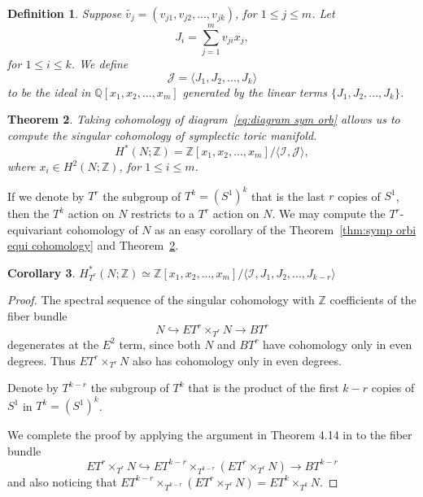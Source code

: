 \documentclass[12pt]{amsart}
\def\Q {{\mathbb{Q}}}
\def\Z {{\mathbb{Z}}}
\def\I {{\mathcal{I}}}
\def\J {{\mathcal{J}}}
\newtheorem{theorem}{Theorem}[section]
\newtheorem{corollary}[theorem]{Corollary}
\newtheorem{definition}[theorem]{Definition}
\theoremstyle{definition}
\numberwithin{equation}{section}
\begin{document}
\begin{definition}
Suppose $\tilde{v_{j}}=(v_{j1},v_{j2},...,v_{jk})$, for $1\leq j\leq
m$. Let
\begin{equation}J_{i}=\sum_{j=1}^{m}v_{ji}x_{j},
\end{equation}
for $1\leq i\leq k$. We define
\begin{equation}
\J=\langle J_{1},J_{2},...,J_{k}\rangle
\end{equation}
to be the ideal in $\Q[x_{1},x_{2},...,x_{m}]$ generated by the
linear terms $\{J_{1},J_{2},...,J_{k}\}$.
\end{definition}

\begin{theorem}\cite{DJ}\label{thm:symp orbi cohomology}
Taking cohomology of diagram~\eqref{eq:diagram sym orb} allows us to
compute the singular cohomology of symplectic toric manifold.
\begin{equation}
H^{*}(N;\Z)=\Z[x_{1},x_{2},...,x_{m}]/\langle \I,\J\rangle ,
\end{equation}
where $x_{i}\in H^{2}(N;\Z)$, for $1\leq i\leq m$.
\end{theorem}

If we denote by $T^r$ the subgroup of $T^k=(S^1)^k$ that is the last
$r$ copies of $S^1$, then the $T^k$ action on $N$ restricts to a
$T^r$ action on $N$. We may compute the $T^r$-equivariant cohomology
of $N$ as an easy corollary of the Theorem~\ref{thm:symp orbi equi
cohomology} and Theorem~\ref{thm:symp orbi cohomology}.

\begin{corollary}
$H_{T^r}^{*}(N;\Z)\simeq \Z[x_{1},x_{2},...,x_{m}]/\langle\I,
J_{1},J_{2},...,J_{k-r}\rangle$
\end{corollary}
\begin{proof}
The spectral sequence of the singular cohomology with $\Z$
coefficients of the fiber bundle
\begin{equation*}
N\hookrightarrow ET^r\times_{T^r}N\rightarrow BT^r
\end{equation*}
degenerates at the $E^{2}$ term, since both $N$ and $BT^r$ have
cohomology only in even degrees. Thus $ET^r\times_{T^r} N$ also has
cohomology only in even degrees.

Denote by $T^{k-r}$ the subgroup of $T^k$ that is the product of the
first $k-r$ copies of $S^1$ in $T^k= (S^1)^k$.

We complete the proof by applying the argument in Theorem 4.14 in
\cite{DJ} to the fiber bundle
\begin{equation*}
ET^r\times_{T^r}N \hookrightarrow
ET^{k-r}\times_{T^{k-r}}(ET^r\times_{T^r}N)\rightarrow BT^{k-r}
\end{equation*}
and also noticing that
$ET^{k-r}\times_{T^{k-r}}(ET^r\times_{T^r}N)=ET^k\times_{T^k}N$.
\end{proof}
\end{document}
